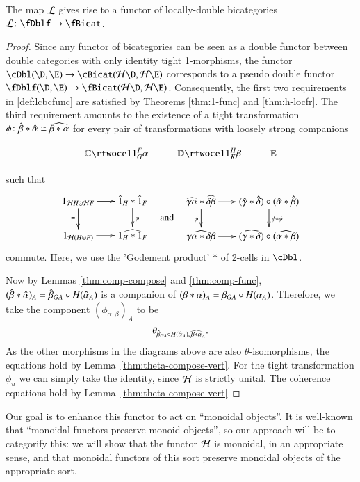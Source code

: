 {\begin{thm}\label{thm:h-functor}
The map $\mathcal{L}$ gives rise to a functor of locally-double bicategories $\cL \maps \fDblf\to \fBicat$.
\end{thm}
\begin{proof}
Since any functor of bicategories can be seen as a double functor between double categories with only identity tight 1-morphisms, the functor $\cDbl(\D,\E) \rightarrow \cBicat(\cH\D, \cH \E)$ corresponds to a pseudo double functor $\fDblf(\D,\E) \rightarrow \fBicat(\cH\D, \cH \E)$. Consequently, the first two requirements in \autoref{def:lcbcfunc} are satisfied by Theorems \ref{thm:1-func} and \ref{thm:h-locfr}.
The third requirement amounts to the existence of a tight transformation $\phi\colon \hat{\beta} * \hat{\alpha} \cong \widehat{\beta*\alpha}$ for every pair of transformations with loosely strong companions 

  \[\vcenter{\xymatrix{\lC \rtwocell^F_G{\al} & \lD \rtwocell^H_K{\be}
      & \lE}}\]
      
      such that 
%
 \begin{equation}
        \vcenter{\xymatrix@-.5pc{
        1_{{\cH}H \odot {\cH}F} \ar[r]\ar[d]_{=} &
        \hat{1}_{H}* \hat{1}_{F}\ar[d]^{\phi}\\
        1_{{\cH}(H \odot F)}\ar[r] &
        \widehat{1_{H} * 1_{F}}}} \quad\text{and}\quad       
    \vcenter{\xymatrix@-.5pc{
        \widehat{\gm\al}* \widehat{\de\be} \ar[r]\ar[d]_\phi &
        (\gmhat* \dehat)\circ(\alhat* \behat)\ar[d]^{\phi * \phi}\\
        \widehat{\gm\al* \de\be}\ar[r] &
        (\widehat{\gm* \de})\circ(\widehat{\al* \be})}}
  \end{equation}
commute. 
Here, we use the 'Godement product' $*$ of 2-cells in $\cDbl$.  

  Now by Lemmas \ref{thm:comp-compose} and
  \ref{thm:comp-func}, $(\hat{\beta} *\hat{\alpha})_A = \hat{\beta}_{GA} \circ
  H(\hat{\alpha}_A)$ is a companion of $(\beta*\alpha)_A = \beta_{GA} \circ
  H(\alpha_A)$.  Therefore, we take the component $(\phi_{\alpha,\beta})_A$ to be
  \[\theta_{\hat{\beta}_{GA} \circ H(\hat{\alpha}_A),\, \widehat{\beta*\alpha}_A}.\]
 As the other morphisms in the diagrams above are also $\theta$-isomorphisms, the equations hold by Lemma~\ref{thm:theta-compose-vert}.
For the tight transformation  $\phi_u$ we can simply take the identity, since $\mathcal{H}$ is strictly unital.
The coherence equations hold by Lemma~\ref{thm:theta-compose-vert}
\end{proof}


Our goal is to enhance this functor to act on ``monoidal objects''.
It is well-known that ``monoidal functors preserve monoid objects'', so our approach will be to categorify this: we will show that the functor $\mathcal{H}$ is monoidal, in an appropriate sense, and that monoidal functors of this sort preserve monoidal objects of the appropriate sort.

}
